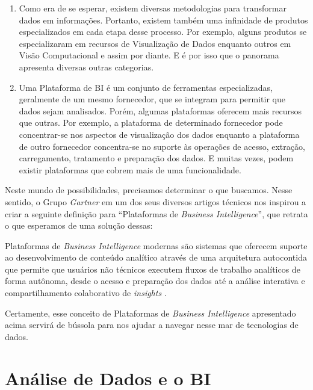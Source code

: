 \begin{enumerate}
    \item Como era de se esperar, existem diversas metodologias para transformar dados em informações. Portanto, existem também uma infinidade de produtos especializados em cada etapa desse processo. Por exemplo, alguns produtos se especializaram em recursos de Visualização de Dados enquanto outros em Visão Computacional e assim por diante. E é por isso que o panorama apresenta diversas outras categorias.
    
    \item Uma Plataforma de BI é um conjunto de ferramentas especializadas, geralmente de um mesmo fornecedor, que se integram para permitir que dados sejam analisados. Porém, algumas plataformas oferecem mais recursos que outras. Por exemplo, a plataforma de determinado fornecedor pode concentrar-se nos aspectos de visualização dos dados enquanto a plataforma de outro fornecedor concentra-se no suporte às operações de acesso, extração, carregamento, tratamento e preparação dos dados. E muitas vezes, podem existir plataformas que cobrem mais de uma funcionalidade.  
\end{enumerate}

Neste mundo de possibilidades, precisamos determinar o que buscamos. Nesse sentido, o Grupo \emph{Gartner} em um dos seus diversos artigos técnicos nos inspirou a criar a seguinte definição para ``Plataformas de \emph{Business Intelligence}'', que retrata o que esperamos de uma solução dessas:

\begin{definition}
Plataformas de \emph{Business Intelligence} modernas são sistemas que oferecem suporte ao desenvolvimento de conteúdo analítico através de uma arquitetura autocontida que permite que usuários não técnicos executem fluxos de trabalho analíticos de forma autônoma, desde o acesso e preparação dos dados até a análise interativa e compartilhamento colaborativo de \emph{insights} \cite[tradução livre,adaptado]{gartner:biplatforms}.
\end{definition}

Certamente, esse conceito de Plataformas de \emph{Business Intelligence} apresentado acima servirá de bússola para nos ajudar a navegar nesse mar de tecnologias de dados. 

\section{Análise de Dados e o BI}

